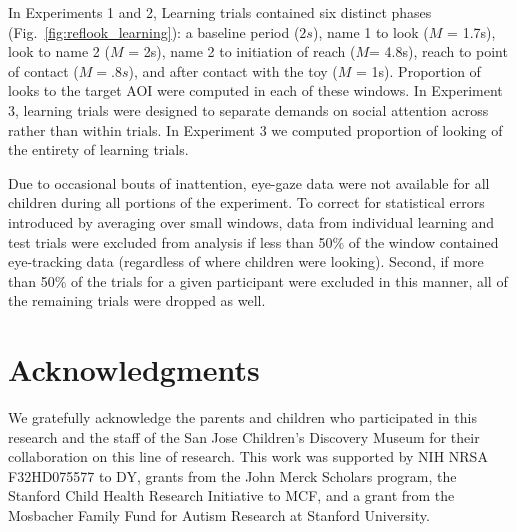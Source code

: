\documentclass[jou,floatsintext]{apa6}
\begin{document}
In Experiments 1 and 2, Learning trials contained six distinct phases (Fig.~\ref{fig:reflook_learning}): a baseline period ($2s$), name 1 to look ({\small$M$ = 1.7s}), look to name 2 ({\small$M$ = 2s}), name 2 to initiation of reach ({\small$M$= 4.8s}), 	reach to point of contact ({\small$M = .8s$}), and after contact with the toy ({\small$M$ = 1s}). Proportion of looks to the target AOI were computed in each of these windows. In Experiment 3, learning trials were designed to separate demands on social attention across rather than within trials. In Experiment 3 we computed proportion of looking of the entirety of learning trials.

Due to occasional bouts of inattention, eye-gaze data were not available for all children during all portions of the experiment. To correct for statistical errors introduced by averaging over small windows, data from individual learning and test trials were excluded from analysis if less than 50\% of the window contained eye-tracking data (regardless of where children were looking). Second, if more than 50\% of the trials for a given participant were excluded in this manner, all of the remaining trials were dropped as well.

\section{Acknowledgments}

We gratefully acknowledge the parents and children who participated in this research and the staff of the San Jose Children's Discovery Museum for their collaboration on this line of research. This work was supported by NIH NRSA F32HD075577 to DY, grants from the John Merck Scholars program, the Stanford Child Health Research Initiative to MCF, and a grant from the Mosbacher Family Fund for Autism Research at Stanford University.



\end{document}
